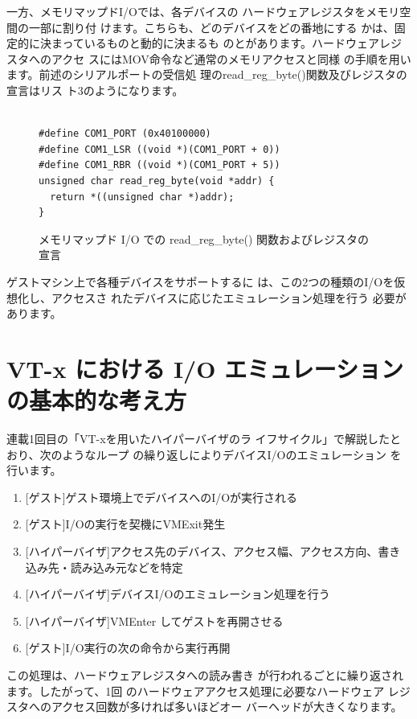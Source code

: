  一方、メモリマップドI/Oでは、各デバイスの
ハードウェアレジスタをメモリ空間の一部に割り付
けます。こちらも、どのデバイスをどの番地にする
かは、固定的に決まっているものと動的に決まるも
のとがあります。ハードウェアレジスタへのアクセ
スにはMOV命令など通常のメモリアクセスと同様
の手順を用います。前述のシリアルポートの受信処
理のread\_reg\_byte()関数及びレジスタの宣言はリス
ト3のようになります。

\begin{figure}\centering

\begin{verbatim}

#define COM1_PORT (0x40100000)
#define COM1_LSR ((void *)(COM1_PORT + 0))
#define COM1_RBR ((void *)(COM1_PORT + 5))
unsigned char read_reg_byte(void *addr) {
  return *((unsigned char *)addr);
}
\end{verbatim}
\caption{メモリマップド I/O での read\_reg\_byte() 関数およびレジスタの宣言}
\end{figure}

 ゲストマシン上で各種デバイスをサポートするに
は、この2つの種類のI/Oを仮想化し、アクセスさ
れたデバイスに応じたエミュレーション処理を行う
必要があります。


\section{VT-x における I/O エミュレーションの基本的な考え方}

 連載1回目の「VT-xを用いたハイパーバイザのラ
イフサイクル」で解説したとおり、次のようなループ
の繰り返しによりデバイスI/Oのエミュレーション
を行います。

\begin{enumerate}
\item{[ゲスト]ゲスト環境上でデバイスへのI/Oが実行される}
\item{[ゲスト]I/Oの実行を契機にVMExit発生}
\item{[ハイパーバイザ]アクセス先のデバイス、アクセス幅、アクセス方向、書き込み先・読み込み元などを特定}
\item{[ハイパーバイザ]デバイスI/Oのエミュレーション処理を行う}
\item{[ハイパーバイザ]VMEnter してゲストを再開させる}
\item{[ゲスト]I/O実行の次の命令から実行再開}
\end{enumerate}

 この処理は、ハードウェアレジスタへの読み書き
が行われるごとに繰り返されます。したがって、1回
のハードウェアアクセス処理に必要なハードウェア
レジスタへのアクセス回数が多ければ多いほどオー
バーヘッドが大きくなります。



